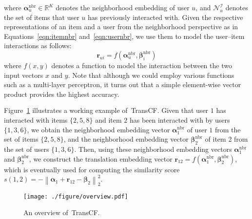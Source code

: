 \documentclass[conference]{IEEEtran}
\newcommand{\norm}[1]{\left\lVert#1\right\rVert}
\newcommand{\propose}{\textsf{{TransCF}}}
\begin{document}
where $\bm{\alpha}_u^{\mathrm{nbr}}\in\mathbb{R}^K$ denotes the neighborhood embedding of user $u$, and $\mathcal{N}^\mathcal{I}_u$ denotes the set of items that user $u$ has previously interacted with.
Given the respective representations of an item and a user from the neighborhood perspective as in Equations~\ref{eqn:itemnbr} and~\ref{eqn:usernbr}, we use them to model the user--item interactions as follows:
\begin{equation*}
\bm{r}_{ui} = f(\bm{\alpha}_u^{\mathrm{nbr}},  \bm{\beta}_i^{\mathrm{nbr}})
\end{equation*}
where $f(x,y)$ denotes a function to model the interaction between the two input vectors $x$ and $y$. Note that although we could employ various functions such as a multi-layer perceptron,
it turns out that a simple element-wise vector product provides the highest accuracy.


Figure~\ref{fig:overview} illustrates a working example of~\propose.
Given that user $1$ has interacted with items $\{2,5,8\}$ and item $2$ has been interacted with by users $\{1,3,6\}$, 
we obtain the neighborhood embedding vector $\bm{\alpha}_1^{\mathrm{nbr}}$ of user $1$ from the set of items $\{2,5,8\}$, and the neighborhood embedding vector $\bm{\beta}_2^{\mathrm{nbr}}$ of item 2 from the set of users $\{1,3,6\}$. Then, using these neighborhood embedding vectors $\bm{\alpha}_1^{\mathrm{nbr}}$ and $\bm{\beta}_2^{\mathrm{nbr}}$, we construct the translation embedding vector $\bm{r}_{12}=f(\bm{\alpha}_1^{\mathrm{nbr}},  \bm{\beta}_2^{\mathrm{nbr}})$, which is eventually used for computing the similarity score $s(1,2)=-\norm{\bm{\alpha}_1+\bm{r}_{12}-\bm{\beta}_2}_2^2$.




\begin{figure}
	\centering
	\texttt{[image: ./figure/overview.pdf]}
\caption{An overview of~\propose. }
	\label{fig:overview}
	\vspace{-3ex}
\end{figure}
\smallskip
\end{document}
